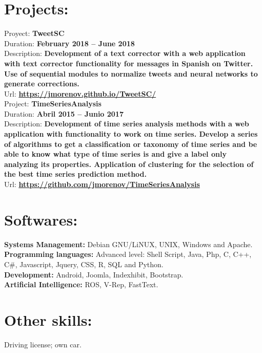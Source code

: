\documentclass	[10pt,a4paper,oneside]{article}
\newcommand{\seccion}[1]{\vspace*{3mm}\section*{#1}\vspace*{-3mm}}
\begin{document}
\seccion{Projects:}

Proyect: \textbf{TweetSC}\\
Duration: \textbf{February 2018 – June 2018}\\
Description: \textbf{Development of a text corrector with a web application with text corrector functionality for messages in Spanish on Twitter. Use of sequential modules to normalize tweets and neural networks to generate corrections.}\\
Url: \textbf{\url{https://jmorenov.github.io/TweetSC/}}\\

Project: \textbf{TimeSeriesAnalysis}\\
Duration: \textbf{Abril 2015 – Junio 2017}\\
Description: \textbf{Development of time series analysis methods with a web application with functionality to work on time series. Develop a series of algorithms to get a classification or taxonomy of time series and be able to know what type of time series is and give a label only analyzing its properties. Application of clustering for the selection of the best time series prediction method.}\\
Url: \textbf{\url{https://github.com/jmorenov/TimeSeriesAnalysis}}


\seccion{Softwares:}
\textbf{Systems Management:} Debian GNU/LiNUX, UNIX, Windows and Apache.\\
\textbf{Programming languages:} Advanced level: Shell Script, Java, Php, C,
C++, C\#, Javascript, Jquery, CSS, R, SQL and Python.\\
\textbf{Development:} Android, Joomla, Indexhibit, Bootstrap.\\
\textbf{Artificial Intelligence:} ROS, V-Rep, FastText.


\seccion{Other skills:}
Driving license; own car.\\
\end{document}
